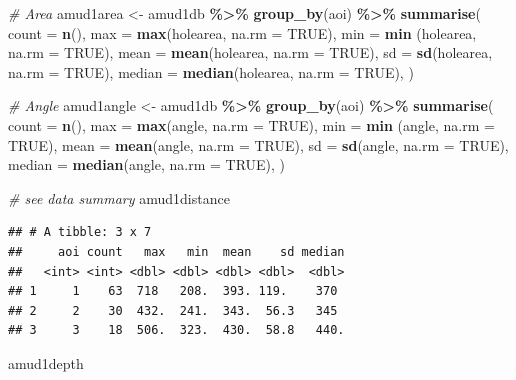 \documentclass[
]{article}
\newenvironment{Shaded}{\begin{snugshade}}{\end{snugshade}}
\newcommand{\AttributeTok}[1]{\textcolor[rgb]{0.13,0.29,0.53}{#1}}
\newcommand{\CommentTok}[1]{\textcolor[rgb]{0.56,0.35,0.01}{\textit{#1}}}
\newcommand{\ConstantTok}[1]{\textcolor[rgb]{0.56,0.35,0.01}{#1}}
\newcommand{\FunctionTok}[1]{\textcolor[rgb]{0.13,0.29,0.53}{\textbf{#1}}}
\newcommand{\NormalTok}[1]{#1}
\newcommand{\OtherTok}[1]{\textcolor[rgb]{0.56,0.35,0.01}{#1}}
\newcommand{\SpecialCharTok}[1]{\textcolor[rgb]{0.81,0.36,0.00}{\textbf{#1}}}
\begin{document}
\begin{Shaded}
\begin{Highlighting}[]
\CommentTok{\# Area}
\NormalTok{amud1area }\OtherTok{\textless{}{-}}\NormalTok{ amud1db }\SpecialCharTok{\%\textgreater{}\%} \FunctionTok{group\_by}\NormalTok{(aoi) }\SpecialCharTok{\%\textgreater{}\%}
      \FunctionTok{summarise}\NormalTok{(}
      \AttributeTok{count =} \FunctionTok{n}\NormalTok{(),}
      \AttributeTok{max =} \FunctionTok{max}\NormalTok{(holearea, }\AttributeTok{na.rm =} \ConstantTok{TRUE}\NormalTok{),}
      \AttributeTok{min =} \FunctionTok{min}\NormalTok{ (holearea, }\AttributeTok{na.rm =} \ConstantTok{TRUE}\NormalTok{),}
      \AttributeTok{mean =} \FunctionTok{mean}\NormalTok{(holearea, }\AttributeTok{na.rm =} \ConstantTok{TRUE}\NormalTok{),}
      \AttributeTok{sd =} \FunctionTok{sd}\NormalTok{(holearea, }\AttributeTok{na.rm =} \ConstantTok{TRUE}\NormalTok{),}
      \AttributeTok{median =} \FunctionTok{median}\NormalTok{(holearea, }\AttributeTok{na.rm =} \ConstantTok{TRUE}\NormalTok{),}
\NormalTok{  ) }

\CommentTok{\# Angle}
\NormalTok{amud1angle }\OtherTok{\textless{}{-}}\NormalTok{ amud1db }\SpecialCharTok{\%\textgreater{}\%} \FunctionTok{group\_by}\NormalTok{(aoi) }\SpecialCharTok{\%\textgreater{}\%}
      \FunctionTok{summarise}\NormalTok{(}
      \AttributeTok{count =} \FunctionTok{n}\NormalTok{(),}
      \AttributeTok{max =} \FunctionTok{max}\NormalTok{(angle, }\AttributeTok{na.rm =} \ConstantTok{TRUE}\NormalTok{),}
      \AttributeTok{min =} \FunctionTok{min}\NormalTok{ (angle, }\AttributeTok{na.rm =} \ConstantTok{TRUE}\NormalTok{),}
      \AttributeTok{mean =} \FunctionTok{mean}\NormalTok{(angle, }\AttributeTok{na.rm =} \ConstantTok{TRUE}\NormalTok{),}
      \AttributeTok{sd =} \FunctionTok{sd}\NormalTok{(angle, }\AttributeTok{na.rm =} \ConstantTok{TRUE}\NormalTok{),}
      \AttributeTok{median =} \FunctionTok{median}\NormalTok{(angle, }\AttributeTok{na.rm =} \ConstantTok{TRUE}\NormalTok{),}
\NormalTok{  ) }

\CommentTok{\# see data summary}
\NormalTok{amud1distance}
\end{Highlighting}
\end{Shaded}

\begin{verbatim}
## # A tibble: 3 x 7
##     aoi count   max   min  mean    sd median
##   <int> <int> <dbl> <dbl> <dbl> <dbl>  <dbl>
## 1     1    63  718   208.  393. 119.    370 
## 2     2    30  432.  241.  343.  56.3   345 
## 3     3    18  506.  323.  430.  58.8   440.
\end{verbatim}

\begin{Shaded}
\begin{Highlighting}[]
\NormalTok{amud1depth}
\end{Highlighting}
\end{Shaded}
\end{document}
